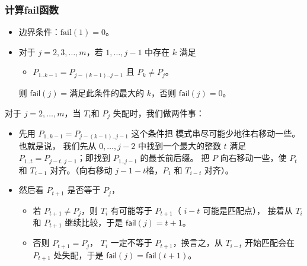 \documentclass{ctexbeamer}
\newcommand{\fail}{\mathsf{fail}}
\begin{document}
\begin{frame}
\frametitle{计算fail函数}

\begin{block}{}
\begin{itemize}
  \item 边界条件：$\text{fail}(1) = 0$。
  \item 对于 $j = 2, 3, \dots, m$，若 $1, \dots, j - 1$ 中存在 $k$ 满足
  {
  \begin{itemize}
  \item $P_{1..k - 1} = P_{j - (k - 1) .. j - 1}$ 且 $P_{k} \ne P_j$。
  \end{itemize}
  则 $\fail(j) = $满足此条件的最大的 $k$，否则 $\fail(j) = 0$。
  }
  \end{itemize}
\end{block}





对于 $j = 2, \dots, m$，当 $T_i$和 $P_j$ 失配时，我们做两件事：

\begin{itemize}
    \item 先用 $P_{1..k - 1} = P_{j - (k - 1) .. j - 1}$ 这个条件把
          模式串尽可能少地往右移动一些。也就是说，
          我们先从 $0, \dots, j - 2$ 中找到一个最大的整数 $t$ 满足 $P_{1..t} = P_{j-t .. j-1}$；即找到 $P_{1..j-1}$ 的{\kaishu 最长前后缀}。
          把 $P$ 向右移动一些，使 $P_{t}$ 和 $T_{i - 1}$ 对齐。（向右移动 $j - 1 - t$格，$P_1$ 和 $T_{i - t}$ 对齐）。 %
    \item 然后看 $P_{t +1}$ 是否等于 $P_j$，
    \begin{itemize}
      \item  若 $P_{t + 1} \ne P_{j}$，则 $T_{i}$ 有可能等于 $P_{t + 1}$（ $i - t$ 可能是匹配点），
      接着从 $T_i$ 和 $P_{t +1}$ 继续比较，于是 $\fail(j) = t + 1$。
      \item  否则 $P_{t+1} = P_j$， $T_{i}$ 一定不等于 $P_{t + 1}$，换言之，从 $T_{i-t}$ 开始匹配会在 $P_{t + 1}$ 处失配，于是 $\fail(j) = \fail(t + 1)$。
    \end{itemize}
   
   
\end{itemize}

\end{frame}
\end{document}
